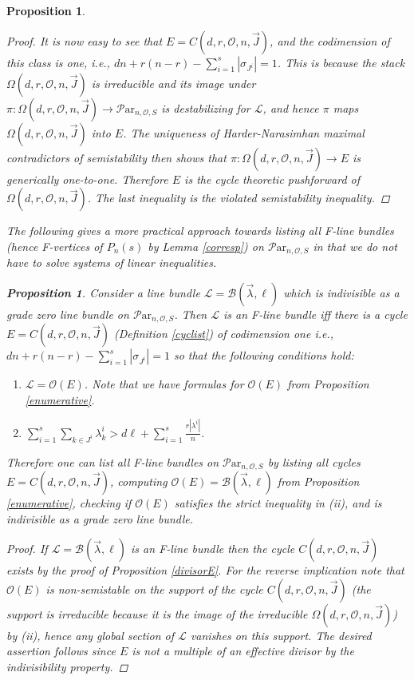 \documentclass[11pt]{amsart}
\newcommand\ml{\mathcal{L}}
\newcommand\Par{\mathcal{P}\text{ar} }
\newtheorem{proposition}[theorem]{Proposition}
\numberwithin{theorem}{subsection}
\begin{document}
{\begin{proposition}
\begin{proof}
It is now easy to see that $E=C(d,r,\mathcal{O},n,\vec{J})$, and the  codimension of this class is one, i.e., $dn+r(n-r)-\sum_{i=1}^s |\sigma_{J^i}|=1$. This is because the stack $\Omega(d,r,\mathcal{O},n,\vec{J})$ is irreducible and its image under $\pi:\Omega(d,r,\mathcal{O},n,\vec{J})\to
\Par_{n,{\mathcal{O}},S}$ is destabilizing for $\ml$, and hence $\pi$ maps $\Omega(d,r,\mathcal{O},n,\vec{J})$ into $E$. The uniqueness of Harder-Narasimhan maximal contradictors of semistability then shows that $\pi:\Omega(d,r,\mathcal{O},n,\vec{J})\to E$ is generically one-to-one. Therefore $E$ is the cycle theoretic pushforward of $\Omega(d,r,\mathcal{O},n,\vec{J})$. The last inequality is the violated semistability inequality.
\end{proof}
The following gives a more practical approach towards listing all F-line bundles (hence F-vertices of $P_n(s)$ by Lemma \ref{corresp}) on $\Par_{n,\mathcal{O},S}$ in that we do not have to solve systems of linear inequalities.
\begin{proposition}\label{practical}
Consider a line bundle  $\ml=\mathcal{B}(\vec{\lambda},\ell)$ which is indivisible as a grade zero line bundle on $\Par_{n,\mathcal{O},S}$. Then $\ml$  is an F-line bundle  iff there is a cycle $E=C(d,r,\mathcal{O},n,\vec{J})$ (Definition  \ref{cyclist})  of codimension one i.e., $dn  +r(n-r)-\sum_{i=1}^s |\sigma_{J^i}|=1$ so that the following conditions hold:
\begin{enumerate}
\item[(i)] $\ml=\mathcal{O}(E)$. Note that we have formulas for $\mathcal{O}(E)$ from Proposition  \ref{enumerative}.
\item[(ii)] $\sum_{i=1}^s \sum_{k\in J^i} \lambda^i_k> d\ell +\sum_{i=1}^s \frac{r|\lambda^i|}{n}.$
\end{enumerate}
Therefore one can list all F-line bundles on $\Par_{n,\mathcal{O},S}$ by listing all cycles $E=C(d,r,\mathcal{O},n,\vec{J})$, computing $\mathcal{O}(E)=\mathcal{B}(\vec{\lambda},\ell)$ from Proposition  \ref{enumerative}, checking if $\mathcal{O}(E)$ satisfies the strict inequality in (ii), and is indivisible as a grade zero line bundle.
\end{proposition}
\begin{proof}
If $\ml=\mathcal{B}(\vec{\lambda},\ell)$ is an F-line bundle then the cycle $C(d,r,\mathcal{O},n,\vec{J})$ exists by the proof of Proposition  \ref{divisorE}. For the reverse implication note that $\mathcal{O}(E)$ is non-semistable on the support of the cycle $C(d,r,\mathcal{O},n,\vec{J})$ (the support is irreducible because it is the image of the irreducible $\Omega(d,r,\mathcal{O},n,\vec{J})$) by (ii), hence any global section of $\ml$ vanishes on this support. The desired assertion follows since  $E$ is not a multiple of an effective divisor by the indivisibility property.
\end{proof}



\end{proposition}}
\end{document}
